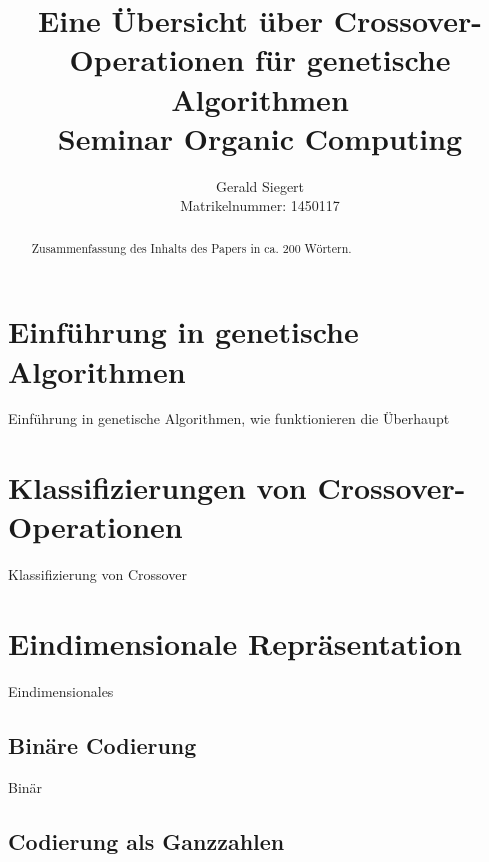 \documentclass{llncs}
\begin{document}
\mainmatter

\title{Eine Übersicht über Crossover-Operationen für genetische Algorithmen\\Seminar Organic Computing}

\author{Gerald Siegert\\Matrikelnummer: 1450117}
\tocauthor{}


\maketitle


\begin{abstract}
	Zusammenfassung des Inhalts des Papers in ca. 200 Wörtern.
\end{abstract}

\pagebreak

\section{Einführung in genetische Algorithmen}

Einführung in genetische Algorithmen, wie funktionieren die Überhaupt

\section{Klassifizierungen von Crossover-Operationen}

Klassifizierung von Crossover

\section{Eindimensionale Repräsentation}

Eindimensionales

\subsection{Binäre Codierung}

Binär

\subsection{Codierung als Ganzzahlen}
\end{document}

